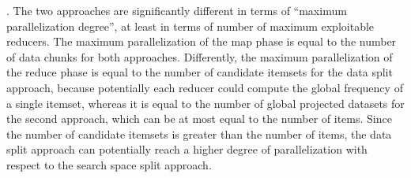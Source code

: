 \documentclass[preprint,review,12pt]{elsarticle}
\begin{document}
. 
The two approaches are significantly different in terms of ``maximum parallelization degree'', at least in terms of number of maximum exploitable reducers. 
The maximum parallelization of the map phase is equal to the number of data chunks for both approaches.
Differently, the maximum parallelization of the reduce phase is equal to the number of candidate itemsets for the data split approach, because potentially each reducer could compute the global frequency of a single itemset, whereas it is equal to the number of global projected datasets for the second approach, which can be at most equal to the number of items. 
Since the number of candidate itemsets is greater than the number of items, the data split approach can potentially reach a higher degree of parallelization with respect to the search space split approach. 
\end{document}
